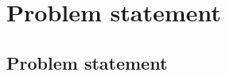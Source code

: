 \chapter{Problem statement}\label{ch:problem-statement}

\section{Problem statement}\label{sec:problem-statement}

\begin{tcolorbox}

\end{tcolorbox}
